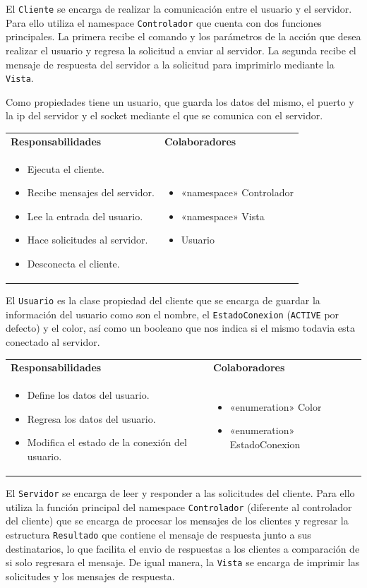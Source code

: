 \documentclass[12pt]{article}  %
\makeatletter
\newcommand{\crc}[3]{
    \begin{center}
        \begin{tcolorbox}[
            colback=maincolor!10, colframe=maincolor,
            colupper=black, fontupper=\footnotesize\ttfamily,
            boxrule=0.2mm, arc=2pt,
            left=3pt, right=3pt, top=1pt, bottom=1pt,
            title={\fontseries{b}\selectfont\footnotesize Class
                \begin{center}
                    #1
                \end{center}},
            colbacktitle=maincolor!35,
            coltitle=black,
            toptitle=4pt, bottomtitle=4pt
            ]

            \begin{tabularx}{\linewidth}{@{}X|X@{}}
              \textbf{\footnotesize Responsabilidades}
              & \textbf{\footnotesize Colaboradores} \\[4pt]
              \begin{itemize}[itemsep=-5pt, leftmargin=*]
                  #2
              \end{itemize}
              &  \begin{itemize}[itemsep=-5pt, leftmargin=*]
                  #3
              \end{itemize}
            \end{tabularx}
        \end{tcolorbox}
    \end{center}
}
\makeatother
\begin{document}
El \texttt{Cliente} se encarga de realizar la comunicación entre el usuario y el
servidor. Para ello utiliza el namespace \texttt{Controlador} que cuenta con
dos funciones principales. La primera recibe el comando y los parámetros de la
acción que desea realizar el usuario y regresa la solicitud a enviar al
servidor. La segunda recibe el mensaje de respuesta del servidor a la solicitud
para imprimirlo mediante la \texttt{Vista}.

Como propiedades tiene un usuario, que guarda los datos del mismo, el puerto y
la ip del servidor y el socket mediante el que se comunica con el servidor.

\crc{Cliente}{
  \item Ejecuta el cliente.
  \item Recibe mensajes del servidor.
  \item Lee la entrada del usuario.
  \item Hace solicitudes al servidor.
  \item Desconecta el cliente.
}{
  \item{«namespace» Controlador}
  \item{«namespace» Vista}
  \item Usuario
}

El \texttt{Usuario} es la clase propiedad del cliente que se encarga de guardar
la información del usuario como son el nombre, el \texttt{EstadoConexion}
(\texttt{ACTIVE} por defecto) y el color, así como un booleano que nos indica si
el mismo todavia esta conectado al servidor.

\crc{Usuario}{
  \item Define los datos del usuario.
  \item Regresa los datos del usuario.
  \item Modifica el estado de la conexión del usuario.
}{
  \item{«enumeration» Color}
  \item{«enumeration» EstadoConexion}
}

El \texttt{Servidor} se encarga de leer y responder a las solicitudes del
cliente. Para ello utiliza la función principal del namespace
\texttt{Controlador} (diferente al controlador del cliente) que se encarga de
procesar los mensajes de los clientes y regresar la estructura
\texttt{Resultado} que contiene el mensaje de respuesta junto a sus
destinatarios, lo que facilita el envio de respuestas a los clientes a
comparación de si solo regresara el mensaje. De igual manera, la \texttt{Vista}
se encarga de imprimir las solicitudes y los mensajes de respuesta.
\end{document}
